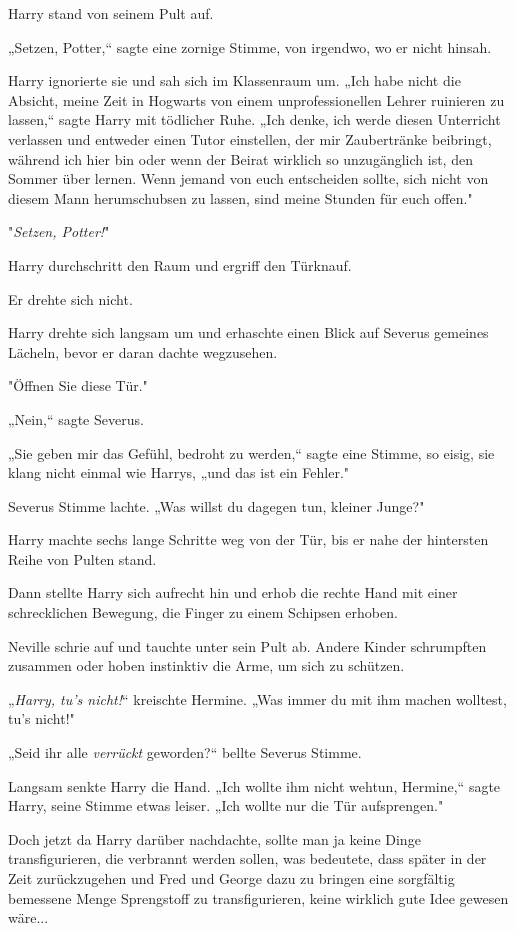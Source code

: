 {Harry stand von seinem Pult auf.

„Setzen, Potter,“ sagte eine zornige Stimme, von irgendwo, wo er nicht hinsah.

Harry ignorierte sie und sah sich im Klassenraum um. „Ich habe nicht die Absicht, meine Zeit in Hogwarts von einem unprofessionellen Lehrer ruinieren zu lassen,“ sagte Harry mit tödlicher Ruhe. „Ich denke, ich werde diesen Unterricht verlassen und entweder einen Tutor einstellen, der mir Zaubertränke beibringt, während ich hier bin oder wenn der Beirat wirklich so unzugänglich ist, den Sommer über lernen. Wenn jemand von euch entscheiden sollte, sich nicht von diesem Mann herumschubsen zu lassen, sind meine Stunden für euch offen."

"\emph{Setzen, Potter!}"

Harry durchschritt den Raum und ergriff den Türknauf.

Er drehte sich nicht.

Harry drehte sich langsam um und erhaschte einen Blick auf Severus gemeines Lächeln, bevor er daran dachte wegzusehen.

"Öffnen Sie diese Tür."

„Nein,“ sagte Severus.

„Sie geben mir das Gefühl, bedroht zu werden,“ sagte eine Stimme, so eisig, sie klang nicht einmal wie Harrys, „und das ist ein Fehler."

Severus Stimme lachte. „Was willst du dagegen tun, kleiner Junge?"

Harry machte sechs lange Schritte weg von der Tür, bis er nahe der hintersten Reihe von Pulten stand.

Dann stellte Harry sich aufrecht hin und erhob die rechte Hand mit einer schrecklichen Bewegung, die Finger zu einem Schipsen erhoben.

Neville schrie auf und tauchte unter sein Pult ab. Andere Kinder schrumpften zusammen oder hoben instinktiv die Arme, um sich zu schützen.

„\emph{Harry, tu's nicht!}“ kreischte Hermine. „Was immer du mit ihm machen wolltest, tu's nicht!"

„Seid ihr alle \emph{verrückt} geworden?“ bellte Severus Stimme.

Langsam senkte Harry die Hand. „Ich wollte ihm nicht wehtun, Hermine,“ sagte Harry, seine Stimme etwas leiser. „Ich wollte nur die Tür aufsprengen."

Doch jetzt da Harry darüber nachdachte, sollte man ja keine Dinge transfigurieren, die verbrannt werden sollen, was bedeutete, dass später in der Zeit zurückzugehen und Fred und George dazu zu bringen eine sorgfältig bemessene Menge Sprengstoff zu transfigurieren, keine wirklich gute Idee gewesen wäre...

}

